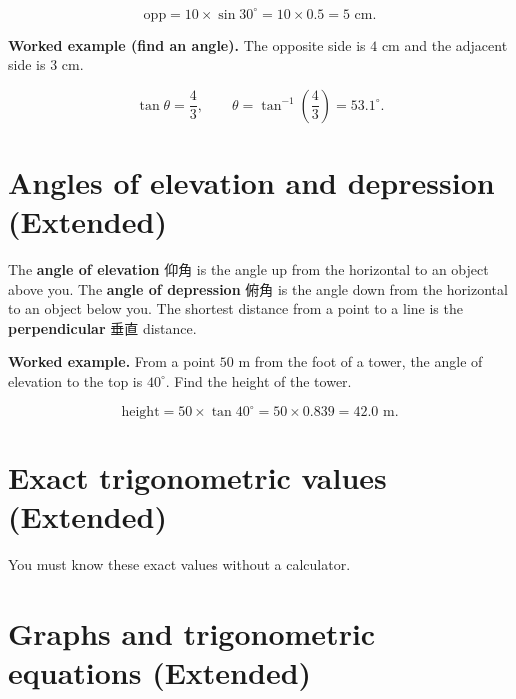 \documentclass[11pt]{article}
\begin{document}
\[
\text{opp} = 10 \times \sin 30^{\circ} = 10 \times 0.5 = 5\text{ cm}.
\]

\textbf{Worked example (find an angle).} The opposite side is $4\text{ cm}$ and the adjacent side is $3\text{ cm}$.

\[
\tan\theta = \frac{4}{3}, \qquad \theta = \tan^{-1}\!\left(\frac{4}{3}\right) = 53.1^{\circ}.
\]

\section*{Angles of elevation and depression (Extended)}

The \textbf{angle of elevation} 仰角 is the angle up from the horizontal to an object above you. The \textbf{angle of depression} 俯角 is the angle down from the horizontal to an object below you. The shortest distance from a point to a line is the \textbf{perpendicular} 垂直 distance.

\textbf{Worked example.} From a point $50\text{ m}$ from the foot of a tower, the angle of elevation to the top is $40^{\circ}$. Find the height of the tower.

\[
\text{height} = 50 \times \tan 40^{\circ} = 50 \times 0.839 = 42.0\text{ m}.
\]

\section*{Exact trigonometric values (Extended)}

You must know these exact values without a calculator.

\begin{center}
\end{center}

\section*{Graphs and trigonometric equations (Extended)}
\end{document}
